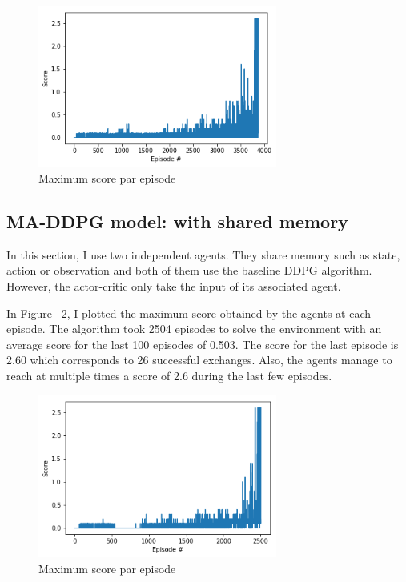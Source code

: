 \documentclass[12pt]{article}
\begin{document}
\begin{center}
\begin{figure}[H]
  \center
  \includegraphics[width=0.7\textwidth]{../PNG/ma_ddpg_1.png}
  \caption{Maximum score par episode}
  \label{fig:ma_ddpg_1}
\end{figure}
\end{center}

\subsection{MA-DDPG model: with shared memory} 
In this section, I use two independent agents. They share memory such as state, action or observation and both of them use the baseline DDPG algorithm. However, the actor-critic only take the input of its associated agent.

In Figure ~\ref{fig:ma_ddpg_2}, I plotted the maximum score obtained by the agents at each episode. 
The algorithm took 2504 episodes to solve the environment with an average score for the last 100 episodes of 0.503. The score for the last episode is 2.60 which corresponds to 26 successful exchanges. Also, the agents manage to reach at multiple times a score of 2.6 during the last few episodes.

\begin{center}
\begin{figure}[H]
  \center
  \includegraphics[width=0.7\textwidth]{../PNG/ma_ddpg_2.png}
  \caption{Maximum score par episode}
  \label{fig:ma_ddpg_2}
\end{figure}
\end{center}
\end{document}
